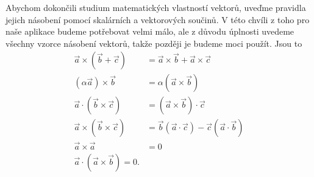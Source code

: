     Abychom dokončili studium matematických vlastností vektorů, uveďme pravidla jejich
    násobení pomocí skalárních a vektorových součinů. V této chvíli z toho pro naše aplikace
    budeme potřebovat velmi málo, ale z důvodu úplnosti uvedeme všechny vzorce násobení
    vektorů, takže později je budeme moci použít. Jsou to
    \begin{subequations}\label{fyz:eq719}
      \begin{align}
         \vec{a}\times(\vec{b}+\vec{c})&= %
            \vec{a}\times\vec{b}+\vec{a}\times\vec{c}                   \label{fyz:eq719a}  \\             
        (\alpha\vec{a})\times\vec{b}&= %
            \alpha(\vec{a}\times\vec{b})                               \label{fyz:eq719b}  \\     
         \vec{a}\cdot(\vec{b}\times\vec{c})&= %
            (\vec{a}\times\vec{b})\cdot\vec{c}                          \label{fyz:eq719c}  \\  
         \vec{a}\times(\vec{b}\times\vec{c})&= %
            \vec{b}(\vec{a}\cdot\vec{c})-\vec{c}(\vec{a}\cdot\vec{b})   \label{fyz:eq719d}  \\          
         \vec{a}\times\vec{a}&=0                                        \label{fyz:eq719e}  \\  
         \vec{a}\cdot(\vec{a}\times\vec{b})=0.                          \label{fyz:eq719f}
      \end{align}
    \end{subequations}

